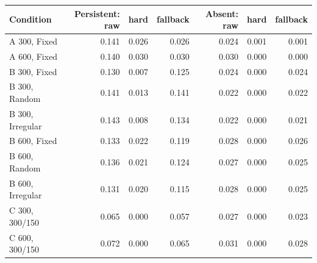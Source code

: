 \begin{tabular}{lrrrrrr}
\toprule
Condition & Persistent: raw & hard & fallback & Absent: raw & hard & fallback \\
\midrule
A 300, Fixed & 0.141 & 0.026 & 0.026 & 0.024 & 0.001 & 0.001 \\
A 600, Fixed & 0.140 & 0.030 & 0.030 & 0.030 & 0.000 & 0.000 \\
B 300, Fixed & 0.130 & 0.007 & 0.125 & 0.024 & 0.000 & 0.024 \\
B 300, Random & 0.141 & 0.013 & 0.141 & 0.022 & 0.000 & 0.022 \\
B 300, Irregular & 0.143 & 0.008 & 0.134 & 0.022 & 0.000 & 0.021 \\
B 600, Fixed & 0.133 & 0.022 & 0.119 & 0.028 & 0.000 & 0.026 \\
B 600, Random & 0.136 & 0.021 & 0.124 & 0.027 & 0.000 & 0.025 \\
B 600, Irregular & 0.131 & 0.020 & 0.115 & 0.028 & 0.000 & 0.025 \\
C 300, 300/150 & 0.065 & 0.000 & 0.057 & 0.027 & 0.000 & 0.023 \\
C 600, 300/150 & 0.072 & 0.000 & 0.065 & 0.031 & 0.000 & 0.028 \\
\bottomrule
\end{tabular}
